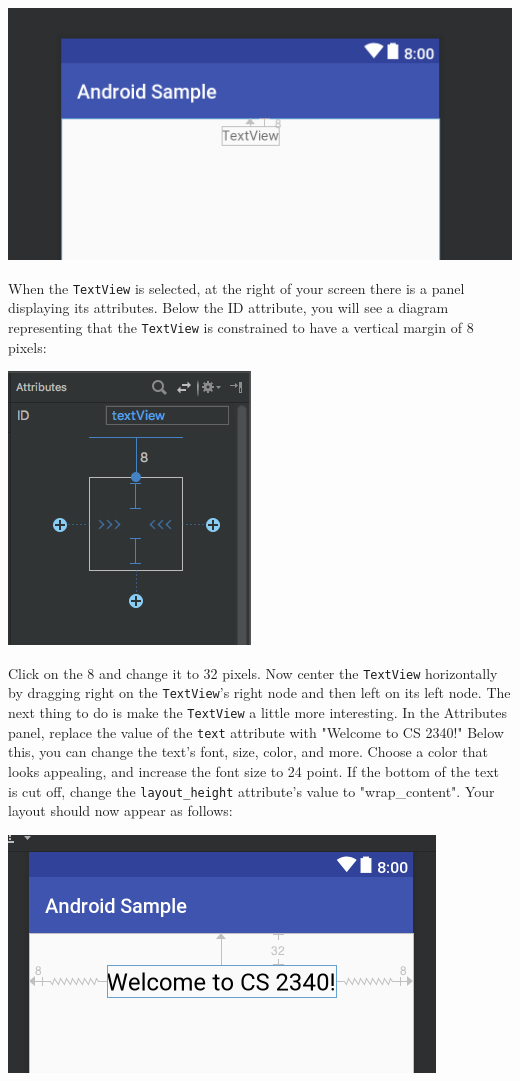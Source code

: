 \documentclass{article}
\begin{document}
\begin{center}\includegraphics[width=.4\textwidth]{images/textview-vc.png}\end{center}
When the \texttt{TextView} is selected, at the right of your screen there is a panel displaying its attributes. Below the ID attribute, you will see a diagram representing that the \texttt{TextView} is constrained to have a vertical margin of 8 pixels:
\begin{center}\includegraphics[width=.3\textwidth]{images/vertical-constraint.png}\end{center}
Click on the 8 and change it to 32 pixels. Now center the \texttt{TextView} horizontally by dragging right on the \texttt{TextView}'s right node and then left on its left node. The next thing to do is make the \texttt{TextView} a little more interesting. In the Attributes panel, replace the value of the \texttt{text} attribute with "Welcome to CS 2340!" Below this, you can change the text's font, size, color, and more. Choose a color that looks appealing, and increase the font size to 24 point. If the bottom of the text is cut off, change the \texttt{layout\_height} attribute's value to "wrap\_content". Your layout should now appear as follows:
\begin{center}\includegraphics[width=.4\textwidth]{images/textview-fancy.png}\end{center}
\end{document}
